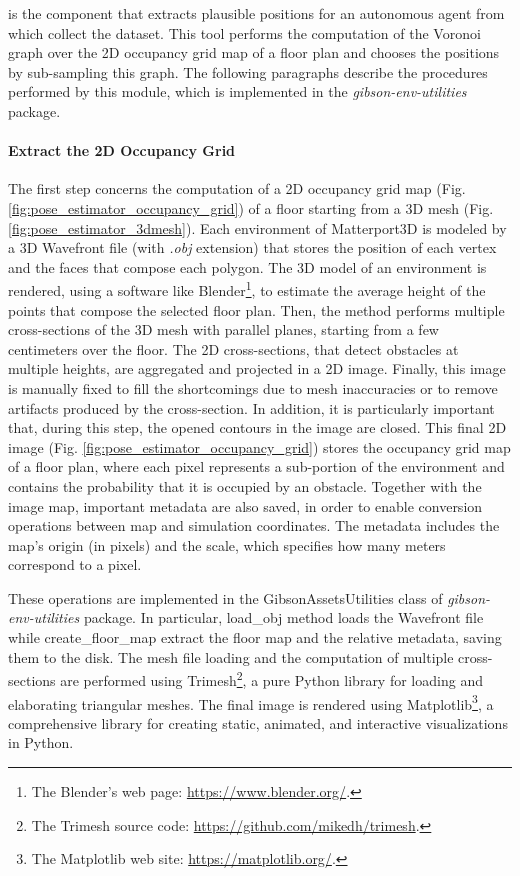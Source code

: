   is the component that extracts plausible positions for an autonomous agent from which collect the dataset. This tool performs the computation of the Voronoi graph over the 2D occupancy grid map \cite{cuupancygridfirst} of a floor plan and chooses the positions by sub-sampling this graph. The following paragraphs describe the procedures performed by this module, which is implemented in the \textit{gibson-env-utilities} package.



\paragraph*{Extract the 2D Occupancy Grid} The first step concerns the computation of a 2D occupancy grid map (Fig. \ref{fig:pose_estimator_occupancy_grid}) of a floor starting from a 3D mesh (Fig. \ref{fig:pose_estimator_3dmesh}). Each environment of Matterport3D is modeled by a 3D Wavefront file (with \textit{.obj} extension) that stores the position of each vertex and the faces that compose each polygon. The 3D model of an environment is rendered, using a software like Blender\footnote{The Blender's web page: \url{https://www.blender.org/}.}, to estimate the average height of the points that compose the selected floor plan. Then, the method performs multiple cross-sections of the 3D mesh with parallel planes, starting from a few centimeters over the floor. The 2D cross-sections, that detect obstacles at multiple heights, are aggregated and projected in a 2D image. Finally, this image is manually fixed to fill the shortcomings due to mesh inaccuracies or to remove artifacts produced by the cross-section. In addition, it is particularly important that, during this step, the opened contours in the image are closed. This final 2D image (Fig. \ref{fig:pose_estimator_occupancy_grid}) stores the occupancy grid map of a floor plan, where each pixel represents a sub-portion of the environment and contains the probability that it is occupied by an obstacle. Together with the image map, important metadata are also saved, in order to enable conversion operations between map and simulation coordinates. The metadata includes the map's origin (in pixels) and the scale, which specifies how many meters correspond to a pixel.

These operations are implemented in the \textsf{GibsonAssetsUtilities} class of \textit{gibson-env-utilities} package. In particular, \textsf{load\_obj} method loads the Wavefront file while \textsf{create\_floor\_map} extract the floor map and the relative metadata, saving them to the disk. The mesh file loading and the computation of multiple cross-sections are performed using Trimesh\footnote{The Trimesh source code: \url{https://github.com/mikedh/trimesh}.}, a pure Python library for loading and elaborating triangular meshes. The final image is rendered using Matplotlib\footnote{The Matplotlib web site: \url{https://matplotlib.org/}.}, a comprehensive library for creating static, animated, and interactive visualizations in Python. 

